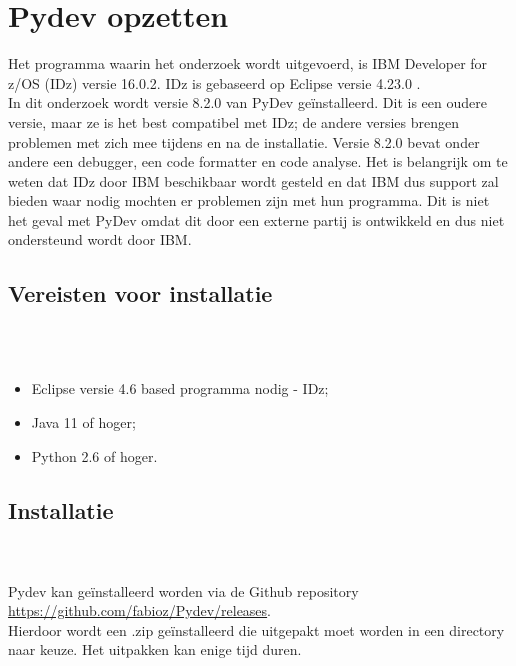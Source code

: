 
\chapter{Pydev opzetten}
\label{ch:opzetten-pydev}

Het programma waarin het onderzoek wordt uitgevoerd, is IBM Developer for z/OS (IDz) versie 16.0.2. IDz is gebaseerd op Eclipse versie 4.23.0 . \\ In dit onderzoek wordt versie 8.2.0 van PyDev geïnstalleerd. Dit is een oudere versie, maar ze is het best compatibel met IDz; de andere versies brengen problemen met zich mee tijdens en na de installatie.
Versie 8.2.0 bevat onder andere een debugger, een code formatter en code analyse. Het is belangrijk om te weten dat IDz door IBM beschikbaar wordt gesteld en dat IBM dus support zal bieden waar nodig mochten er problemen zijn met hun programma. Dit is niet het geval met PyDev omdat dit door een externe partij is ontwikkeld en dus niet ondersteund wordt door IBM. \\

\section{Vereisten voor installatie} 
\\ \\
\begin{itemize}
    \item Eclipse versie 4.6 based programma nodig - IDz;
    \item Java 11 of hoger;
    \item Python 2.6 of hoger.
\end{itemize}


\section{Installatie} 
\\ \\
Pydev kan geïnstalleerd worden via de Github repository \url{https://github.com/fabioz/Pydev/releases}. \\Hierdoor wordt een .zip geïnstalleerd die uitgepakt moet worden in een directory naar keuze. Het uitpakken kan enige tijd duren. \\

